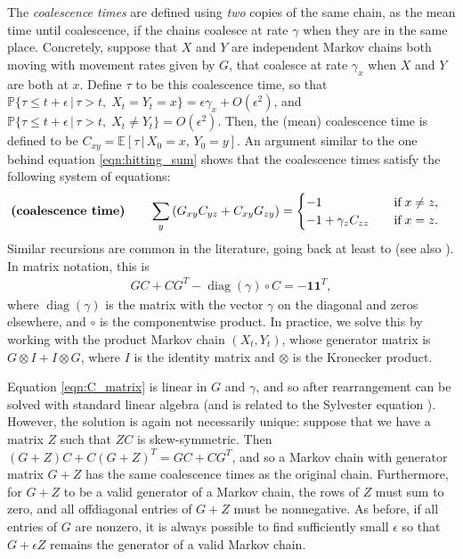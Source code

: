 \documentclass{article}
\DeclareMathOperator{\diag}{\mathop{\mbox{diag}}}
\renewcommand{\P}{\mathbb{P}}
\newcommand{\E}{\mathbb{E}}
\newcommand{\given}{\,\vert\,}
\newcommand{\bone}{\mathbf{1}}
\begin{document}
The \emph{coalescence times} are defined using \emph{two} copies of the same chain,
as the mean time until coalescence,
if the chains coalesce at rate $\gamma$ when they are in the same place.
Concretely, 
suppose that $X$ and $Y$ are independent Markov chains both moving with movement rates given by $G$,
that coalesce at rate $\gamma_x$ when $X$ and $Y$ are both at $x$.
Define $\tau$ to be this coalescence time,
so that 
$\P\{\tau \le t + \epsilon \given \tau > t, \; X_t = Y_t = x\} = \epsilon \gamma_x + O(\epsilon^2)$,
and 
$\P\{\tau \le t + \epsilon \given \tau > t, \; X_t \neq Y_t\} = O(\epsilon^2)$.
Then, the (mean) coalescence time is defined to be
$C_{xy} = \E[\tau \given X_0 = x, \, Y_0 = y]$.
An argument similar to the one behind equation \eqref{eqn:hitting_sum}
shows that the coalescence times satisfy the following system of equations:
\begin{align}
\text{\bf (coalescence time)} \qquad
    \sum_y \left(G_{xy} C_{yz} + C_{xy} G_{zy}\right)
    &=
    \begin{cases}
        -1                   \quad & \text{if} \; x \neq z, \\
        -1 + \gamma_z C_{zz} \quad & \text{if} \; x = z.
    \end{cases}
\end{align}
Similar recursions are common in the literature,
going back at least to \citet{hill1972effective} (see also \citet{whitlock1997effective}).
In matrix notation, this is
\begin{align} \label{eqn:C_matrix}
    G C + C G^T - \diag(\gamma) \circ C = -\bone \bone^T,
\end{align}
where $\diag(\gamma)$ is the matrix with the vector $\gamma$ on the diagonal and zeros elsewhere,
and $\circ$ is the componentwise product.
In practice, we solve this by working with the product Markov chain $(X_t, Y_t)$,
whose generator matrix is $G \otimes I + I \otimes G$, 
where $I$ is the identity matrix and $\otimes$ is the Kronecker product.

Equation \eqref{eqn:C_matrix} is linear in $G$ and $\gamma$,
and so after rearrangement can be solved with standard linear algebra
(and is related to the Sylvester equation \citep{bhatia1997solve}).
However, the solution is again not necessarily unique:
suppose that we have a matrix $Z$ such that $ZC$ is skew-symmetric.
Then $(G + Z) C + C (G + Z)^T = GC + CG^T$,
and so a Markov chain with generator matrix $G + Z$ has the same coalescence times
as the original chain.
Furthermore, for $G + Z$ to be a valid generator of a Markov chain,
the rows of $Z$ must sum to zero,
and all offdiagonal entries of $G + Z$ must be nonnegative. 
As before, if all entries of $G$ are nonzero, 
it is always possible to find sufficiently small $\epsilon$
so that $G + \epsilon Z$ remains the generator of a valid Markov chain.
\end{document}

